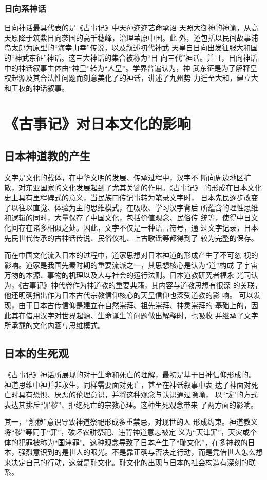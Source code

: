 \documentclass{ctexart}
\begin{document}
\subsubsection{日向系神话}
日向神话最具代表的是《古事记》中天孙迩迩艺命承诏
天照大御神的神谕，从高天原降于筑紫日向袭国的高千穗峰，治理苇原中国。此
外，还包括以民间故事浦岛太郎为原型的“海幸山幸”传说，以及叙述初代神武
天皇自日向出发征服大和国的“神武东征”神话。这三大神话的集合被称为“日
向三代”神话。并且，日向神话中的神话叙事主体由“神皇”转为“人皇”。学界普遍认为，神
武东征是为了解释皇权起源及其合法性问题而刻意美化了的神话，讲述了九州势
力迁至大和，建立大和王权的神话叙事。

\section{《古事记》对日本文化的影响}

\subsection{日本神道教的产生}

文字是文化的载体，在中华文明的发展、传承过程中，汉字不
断向周边地区扩散，对东亚国家的文化发展起到了尤其关键的作用。《古事记》
的形成在日本文化史上具有里程碑式的意义，当民族口传记事转为笔录文字时，
日本先民逐步改变了以往以直觉、体验为主的思维模式，在吸收、学习汉字背后
所蕴含的理性思维和逻辑的同时，大量保存了中国文化，包括价值观念、民俗传
统等，使得中日文化间存在诸多相似之处。因此，文字不仅是一种语言符号，通
过文字记录，日本先民世代传承的古神话传说、民俗仪礼、上古歌谣等都得到了
较为完整的保存。\par
而在中国文化流入日本的过程中，道家思想对日本神道的形成产生了不可忽
视的影响。道家是我国先秦时期的重要流派之一，其思想核心是认为“道”构成
了宇宙万物的本源、事物的机理以及人与社会的运行法则。日本道教研究者福永
光司认为，《古事记》神代卷作为神道教的重要典籍，其内容与道教思想有很深
的关联，他还明确指出作为日本古代宗教信仰核心的天皇信仰也深受道教的影
响。 可以发现，由于日本古传信仰是建立在自然崇拜、祖先崇拜、神灵崇拜的
基础上的，因此其在借用汉字对世界起源、生命诞生等问题做出解释时，也吸收
并继承了文字所承载的文化内涵与思维模式。

\subsection{日本的生死观}

《古事记》神话所展现的对于生命和死亡的理解，最初是基于日神信仰形成的。
神道思维中神并非永生，同样需要面对死亡，甚至在神话叙事中表
达了神面对死亡时具有恐惧、厌恶的伦理意识，并将这种观念与认识通过隐喻，
以“祓”的方式表达其排斥“罪秽”、拒绝死亡的宗教心理。这种生死观念带来
了两方面的影响。\par
其一，“触秽”意识导致神道祭祀形成多重禁忌，对现世的人
形成约束。神道教义将“秽”等同于“罪”，破坏农耕祭祀、违背神道意志被定
义为“天津罪”，天灾或个体的犯罪被称为“国津罪”。这种观念导致了日本产生了“耻文化”，在多神教的日本，强烈意识到的是世人的眼光。不是靠正确与否决定行动，而是凭借世人怎么想来决定自己的行动，这就是耻文化。耻文化的出现与日本的社会构造有深刻的联系。
\end{document}
